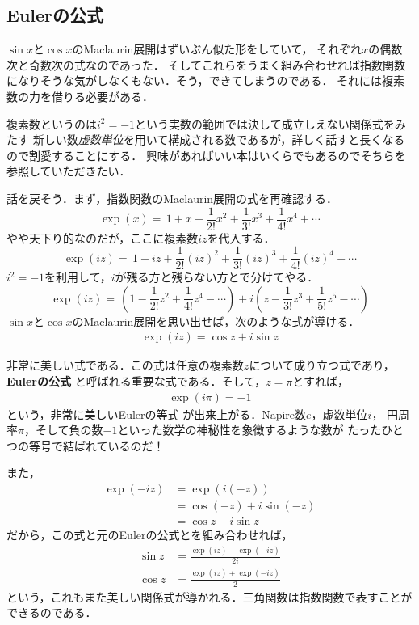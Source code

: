 \subsection{\textrm{Euler}の公式}
$\sin x$と$\cos x$のMaclaurin展開はずいぶん似た形をしていて，
それぞれ$x$の偶数次と奇数次の式なのであった．
そしてこれらをうまく組み合わせれば指数関数になりそうな気がしなくもない．そう，できてしまうのである．
それには複素数の力を借りる必要がある．

複素数というのは$i^2=-1$という実数の範囲では決して成立しえない関係式をみたす
新しい数\emph{虚数単位}を用いて構成される数であるが，詳しく話すと長くなるので割愛することにする．
興味があればいい本はいくらでもあるのでそちらを参照していただきたい．

話を戻そう．まず，指数関数のMaclaurin展開の式を再確認する．
$$
\exp(x) = \, 1 + x +\frac{1}{2!} x^2 +\frac{1}{3!} x^3 + \frac{1}{4!} x^4 + \cdots
$$
やや天下り的なのだが，ここに複素数$iz$を代入する．
$$
\exp(iz) = \, 1 + iz +\frac{1}{2!} (iz)^2 +\frac{1}{3!} (iz)^3 + \frac{1}{4!} (iz)^4 + \cdots
$$
$i^2=-1$を利用して，$i$が残る方と残らない方とで分けてやる．
$$
\exp(iz) = \, \left(1- \frac{1}{2!} z^2 + \frac{1}{4!} z^4 - \cdots \right) + i 
\left( z - \frac{1}{3!}z^3 + \frac{1}{5!}z^5 - \cdots \right)
$$
$\sin x$と$\cos x$のMaclaurin展開を思い出せば，次のような式が導ける．
\begin{align}
\exp (iz) = \cos z + i \sin z
\label{eq:Euler}
\end{align}

非常に美しい式である．この式は任意の複素数$z$について成り立つ式であり，
\textbf{Eulerの公式}
と呼ばれる重要な式である．そして，$z=\pi$とすれば，
\begin{align}
\exp (i \pi ) = -1
\label{eq:Eulertousiki}
\end{align}
という，非常に美しいEulerの等式
が出来上がる．Napire数$e$，虚数単位$i$，
円周率$\pi$，そして負の数$-1$といった数学の神秘性を象徴するような数が
たったひとつの等号で結ばれているのだ！ 

また，
\begin{align*}
\exp (-iz) & = \exp (i(-z)) \\
& = \cos (-z) + i \sin (-z) \\
& = \cos z - i \sin z
\end{align*} 
だから，この式と元のEulerの公式とを組み合わせれば，
\begin{align}
\sin z & = \frac{\exp (iz) - \exp (-iz)}{2i} \\
\cos z & = \frac{\exp (iz) + \exp (-iz)}{2} 
\end{align}
という，これもまた美しい関係式が導かれる．三角関数は指数関数で表すことができるのである．

